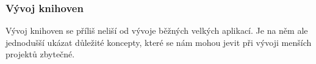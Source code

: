 \begin{frame}
    \frametitle{Vývoj knihoven}

    Vývoj knihoven se příliš neliší od vývoje běžných velkých aplikací. 
    Je na něm ale jednodušší ukázat důležité koncepty, které se nám mohou jevit při vývoji menších projektů zbytečné.

\end{frame}